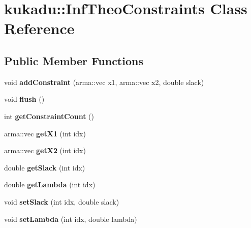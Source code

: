 \hypertarget{classkukadu_1_1InfTheoConstraints}{}\section{kukadu\+:\+:Inf\+Theo\+Constraints Class Reference}
\label{classkukadu_1_1InfTheoConstraints}
\subsection*{Public Member Functions}
\begin{DoxyCompactItemize}
\item 
void {\bfseries add\+Constraint} (arma\+::vec x1, arma\+::vec x2, double slack)\hypertarget{classkukadu_1_1InfTheoConstraints_aa25c31a3ac239b93ca899d5c0dab9f49}{}\label{classkukadu_1_1InfTheoConstraints_aa25c31a3ac239b93ca899d5c0dab9f49}

\item 
void {\bfseries flush} ()\hypertarget{classkukadu_1_1InfTheoConstraints_ac1d85733f326e20e6900ad3debafda0f}{}\label{classkukadu_1_1InfTheoConstraints_ac1d85733f326e20e6900ad3debafda0f}

\item 
int {\bfseries get\+Constraint\+Count} ()\hypertarget{classkukadu_1_1InfTheoConstraints_a722ffde92b39ab76c9fde6629acbebf6}{}\label{classkukadu_1_1InfTheoConstraints_a722ffde92b39ab76c9fde6629acbebf6}

\item 
arma\+::vec {\bfseries get\+X1} (int idx)\hypertarget{classkukadu_1_1InfTheoConstraints_a085b65427f852bad0414f758cd21821e}{}\label{classkukadu_1_1InfTheoConstraints_a085b65427f852bad0414f758cd21821e}

\item 
arma\+::vec {\bfseries get\+X2} (int idx)\hypertarget{classkukadu_1_1InfTheoConstraints_aea03b865c1285775b57fcf88f1d7104c}{}\label{classkukadu_1_1InfTheoConstraints_aea03b865c1285775b57fcf88f1d7104c}

\item 
double {\bfseries get\+Slack} (int idx)\hypertarget{classkukadu_1_1InfTheoConstraints_ac006e5b1d58e8fbea8985786766d6596}{}\label{classkukadu_1_1InfTheoConstraints_ac006e5b1d58e8fbea8985786766d6596}

\item 
double {\bfseries get\+Lambda} (int idx)\hypertarget{classkukadu_1_1InfTheoConstraints_a164b756056c091f61414275c05617b01}{}\label{classkukadu_1_1InfTheoConstraints_a164b756056c091f61414275c05617b01}

\item 
void {\bfseries set\+Slack} (int idx, double slack)\hypertarget{classkukadu_1_1InfTheoConstraints_adb17a3786b877a8001051697131349c4}{}\label{classkukadu_1_1InfTheoConstraints_adb17a3786b877a8001051697131349c4}

\item 
void {\bfseries set\+Lambda} (int idx, double lambda)\hypertarget{classkukadu_1_1InfTheoConstraints_ac418da12a5d931c5acee6dc724123f3a}{}\label{classkukadu_1_1InfTheoConstraints_ac418da12a5d931c5acee6dc724123f3a}

\end{DoxyCompactItemize}


